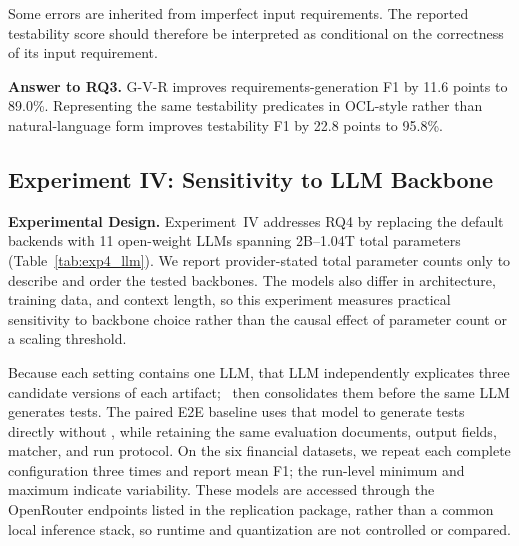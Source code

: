 Some errors are inherited from imperfect input requirements. The reported
testability score should therefore be interpreted as conditional on the
correctness of its input requirement.





\noindent\textbf{Answer to RQ3.}
G-V-R improves requirements-generation F1 by 11.6 points to 89.0\%.
Representing the same testability predicates in OCL-style rather than
natural-language form improves testability F1 by 22.8 points to 95.8\%.



\subsection{Experiment IV: Sensitivity to LLM Backbone}
\label{sec:exp4}

\noindent
\textbf{Experimental Design.}
Experiment~IV addresses RQ4 by replacing the default backends with 11
open-weight LLMs spanning 2B--1.04T total parameters (Table~\ref{tab:exp4_llm}).
We report provider-stated total parameter counts only to describe and order the
tested backbones. The models also differ in architecture, training data, and
context length, so this experiment measures practical sensitivity to backbone
choice rather than the causal effect of parameter count or a scaling threshold.

Because each setting contains one LLM, that LLM independently explicates three
candidate versions of each artifact; \strategy\ then consolidates them before
the same LLM generates tests. The paired E2E baseline uses that model to
generate tests directly without \ourtool, while retaining the same evaluation
documents, output fields, matcher, and run protocol. On the six financial
datasets, we repeat each complete configuration three times and report mean F1;
the run-level minimum and maximum indicate variability. These models are
accessed through the OpenRouter endpoints listed in the replication package,
rather than a common local inference stack, so runtime and quantization are not
controlled or compared.

